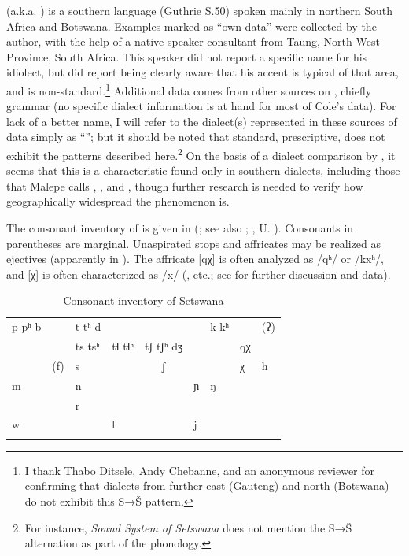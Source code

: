 \documentclass[output=paper,newtxmath,modfonts,nonflat,hidelinks]{langsci/langscibook}
\begin{document}
 (a.k.a. ) is a southern  language (Guthrie S.50) spoken mainly in northern South Africa and Botswana. Examples marked as ``own data'' were collected by the author, with the help of a native-speaker consultant from Taung, North-West Province, South Africa. This speaker did not report a specific name for his idiolect, but did report being clearly aware that his accent is typical of that area, and is non-standard.\footnote{I thank Thabo Ditsele, Andy Chebanne, and an anonymous reviewer for confirming that  dialects from further east (Gauteng) and north (Botswana) do not exhibit this S→Š pattern.} Additional data comes from other sources on , chiefly  grammar (no specific dialect information is at hand for most of Cole’s data). For lack of a better name, I will refer to the dialect(s) represented in these sources of data simply as ``''; but it should be noted that standard, prescriptive,  does not exhibit the patterns described here.\footnote{For instance,  \textit{Sound System of Setswana} does not mention the S→Š alternation as part of the phonology.} On the basis of a dialect comparison by \citet{Malepe1966}, it seems that this is a characteristic found only in southern dialects, including those that Malepe calls , , and , though further research is needed to verify how geographically widespread the phenomenon is.

The consonant inventory of  is given in  %
 (\citealt{Bennett2016}; see also \citealt{Cole1955}; \citealt{chebanneetal1997}, U. \citealt{University-of-Botswana:2001aa}). Consonants in parentheses are marginal. Unaspirated stops and affricates may be realized as ejectives (apparently in ). The affricate [qχ] is often analyzed as /qʰ/ or /kxʰ/, and [χ] is often characterized as /x/ (\citealt{Cole1955}, etc.; see \citealt{Bennett2016} for further discussion and data).
 

\begin{table}
\begin{tabularx}{\textwidth}{XXXXcXXXX}
\lsptoprule

p pʰ   b &  & t   tʰ   d &  &  &  & k  kʰ &  & (ʔ)\\
&  & ts tsʰ & tɬ   tɬʰ & tʃ   tʃʰ dʒ &  &  & qχ & \\
& (f) & s &  & ʃ &  &  & χ & h \\
m &  & n &  &  & ɲ & ŋ &  & \\
&  & r &  &  &  &  &  & \\
w &  &  & l &  & j &  &  & \\
\lspbottomrule
\end{tabularx}
\caption{Consonant inventory of Setswana}
\label{tab:bennett:1}
\end{table}
\end{document}
